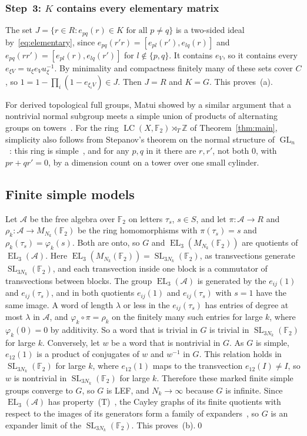 \documentclass[11pt]{amsart}
\newcommand{\F}{\mathbb F}
\newcommand{\Z}{\mathbb Z}
\newcommand{\LC}{\operatorname{LC}}
\newcommand{\EL}{\operatorname{EL}}
\newcommand{\GL}{\operatorname{GL}}
\newcommand{\SL}{\operatorname{SL}}
\begin{document}
\subsubsection*{Step~3: $K$ contains every elementary matrix}
The set $J=\{r\in R:e_{pq}(r)\in K\text{ for all }p\ne q\}$ is a
two-sided ideal by~\eqref{eq:elementary}, since
$e_{pq}(r'r)=[e_{pl}(r'),e_{lq}(r)]$ and
$e_{pq}(rr')=[e_{pl}(r),e_{lq}(r')]$ for $l\notin\{p,q\}$. It contains
$e_V$, so it contains every $e_{\xi V}=u_\xi e_Vu_\xi^{-1}$. By minimality
and compactness finitely many of these sets cover $C$, so
$1=1-\prod_i(1-e_{\xi_iV})\in J$. Then $J=R$ and $K=G$. This proves~(a).

For derived topological full groups, Matui showed by a similar argument
that a nontrivial normal subgroup meets a simple union of products of
alternating groups on towers~\cite[Lemma~3.4 and Theorem~4.9]{Matui}. For the ring
$\LC(X,\F_2)\rtimes_T\Z$ of Theorem~\ref{thm:main}, simplicity also follows
from Stepanov's theorem on the normal structure of
$\GL_n$~\cite[Theorem~4.4]{Stepanov}: this ring is
simple~\cite[Corollary~4.6]{ClarkEdie}, and for any $p,q$ in it there are
$r,r'$, not both $0$, with $pr+qr'=0$, by a dimension count on a tower over
one small cylinder.

\subsection*{Finite simple models}
Let $\mathcal A$ be the free algebra over $\F_2$ on letters $\tau_s$,
$s\in S$, and let $\pi\colon\mathcal A\to R$ and
$\rho_k\colon\mathcal A\to M_{N_k}(\F_2)$ be the ring homomorphisms with
$\pi(\tau_s)=s$ and $\rho_k(\tau_s)=\varphi_k(s)$. Both are onto, so $G$
and $\EL_3(M_{N_k}(\F_2))$ are quotients of $\EL_3(\mathcal A)$. Here
$\EL_3(M_{N_k}(\F_2))=\SL_{3N_k}(\F_2)$, as transvections generate
$\SL_{3N_k}(\F_2)$, and each transvection inside one block is a commutator
of transvections between blocks. The group $\EL_3(\mathcal A)$ is
generated by the $e_{ij}(1)$ and $e_{ij}(\tau_s)$, and in both quotients
$e_{ij}(1)$ and $e_{ij}(\tau_s)$ with $s=1$ have the same image. A word of
length $\lambda$ or less in the $e_{ij}(\tau_s)$ has entries of degree at
most $\lambda$ in $\mathcal A$, and $\varphi_k\circ\pi=\rho_k$ on the
finitely many such entries for large $k$, where $\varphi_k(0)=0$ by
additivity. So a word that is trivial in $G$ is trivial in
$\SL_{3N_k}(\F_2)$ for large $k$. Conversely, let $w$ be a word that is
nontrivial in $G$. As $G$ is simple, $e_{12}(1)$ is a product of conjugates
of $w$ and $w^{-1}$ in $G$. This relation holds in $\SL_{3N_k}(\F_2)$ for
large $k$, where $e_{12}(1)$ maps to the transvection $e_{12}(I)\ne I$, so
$w$ is nontrivial in $\SL_{3N_k}(\F_2)$ for large $k$. Therefore these
marked finite simple groups converge to $G$, so
$G$ is LEF, and $N_k\to\infty$ because $G$ is infinite. Since
$\EL_3(\mathcal A)$ has property~\textup{(T)}~\cite[Theorem~1.1]{EJZ}, the
Cayley graphs of its finite quotients with respect to the images of its
generators form a family of expanders~\cite{Margulis,Kassabov}, so $G$ is
an expander limit of the $\SL_{3N_k}(\F_2)$. This proves~(b).\qed
\end{document}
